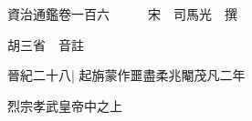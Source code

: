 






























































資治通鑑卷一百六　　　宋　司馬光　撰

胡三省　音註

晉紀二十八|{
	起旃蒙作噩盡柔兆閹茂凡二年}


烈宗孝武皇帝中之上


